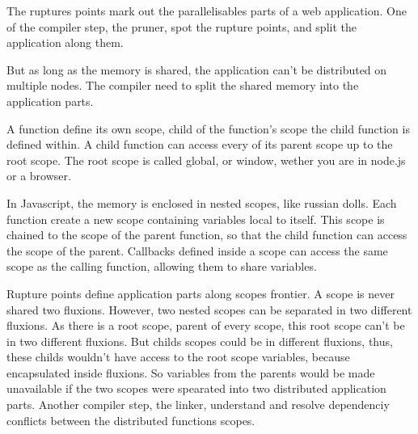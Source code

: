 

The ruptures points mark out the parallelisables parts of a web application.
One of the compiler step, the pruner, spot the rupture points, and split the application along them.

But as long as the memory is shared, the application can't be distributed on multiple nodes.
The compiler need to split the shared memory into the application parts.

A function define its own scope, child of the function's scope the child function is defined within.
A child function can access every of its parent scope up to the root scope.
The root scope is called global, or window, wether you are in node.js or a browser.

In Javascript, the memory is enclosed in nested scopes, like russian dolls.
Each function create a new scope containing variables local to itself.
This scope is chained to the scope of the parent function, so that the child function can access the scope of the parent.
Callbacks defined inside a scope can access the same scope as the calling function, allowing them to share variables.

Rupture points define application parts along scopes frontier.
A scope is never shared two fluxions.
However, two nested scopes can be separated in two different fluxions.
As there is a root scope, parent of every scope, this root scope can't be in two different fluxions.
But childs scopes could be in different fluxions, thus, these childs wouldn't have access to the root scope variables, because encapsulated inside fluxions.
So variables from the parents would be made unavailable if the two scopes were spearated into two distributed application parts.
Another compiler step, the linker, understand and resolve dependenciy conflicts between the distributed functions scopes.





